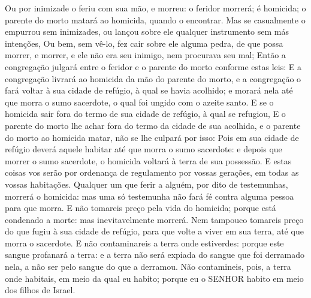 {{{{{  Ou por inimizade o feriu com sua mão, e morreu: o feridor morrerá; é homicida; o parente do morto matará ao homicida, quando o encontrar.
  Mas se casualmente o empurrou sem inimizades, ou lançou sobre ele qualquer instrumento sem más intenções,
  Ou bem, sem vê-lo, fez cair sobre ele alguma pedra, de que possa morrer, e morrer, e ele não era seu inimigo, nem procurava seu mal;
  Então a congregação julgará entre o feridor e o parente do morto conforme estas leis:
  E a congregação livrará ao homicida da mão do parente do morto, e a congregação o fará voltar à sua cidade de refúgio, à qual se havia acolhido; e morará nela até que morra o sumo sacerdote, o qual foi ungido com o azeite santo. %
  E se o homicida sair fora do termo de sua cidade de refúgio, à qual se refugiou,
  E o parente do morto lhe achar fora do termo da cidade de sua acolhida, e o parente do morto ao homicida matar, não se lhe culpará por isso:
  Pois em sua cidade de refúgio deverá aquele habitar até que morra o sumo sacerdote: e depois que morrer o sumo sacerdote, o homicida voltará à terra de sua possessão.
  E estas coisas vos serão por ordenança de regulamento por vossas gerações, em todas as vossas habitações.
  Qualquer um que ferir a alguém, por dito de testemunhas, morrerá o homicida: mas uma só testemunha não fará fé contra alguma pessoa para que morra.
  E não tomareis preço pela vida do homicida; porque está condenado a morte: mas inevitavelmente morrerá.
  Nem tampouco tomareis preço do que fugiu à sua cidade de refúgio, para que volte a viver em sua terra, até que morra o sacerdote.
  E não contaminareis a terra onde estiverdes: porque este sangue profanará a terra: e a terra não será expiada do sangue que foi derramado nela, a não ser pelo sangue do que a derramou.
  Não contamineis, pois, a terra onde habitais, em meio da qual eu habito; porque eu o SENHOR habito em meio dos filhos de Israel}}}}.
\par }

